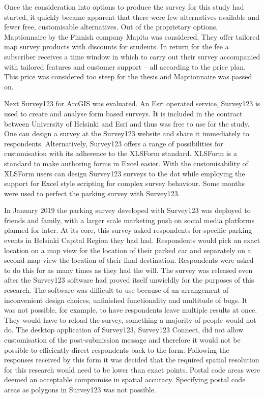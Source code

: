 Once the consideration into options to produce the survey for this study had started, it quickly became apparent that there were few alternatives available and fewer free, customisable alternatives. Out of the proprietary options, Maptionnaire by the Finnish company Mapita was considered. They offer tailored map survey products with discounts for students. In return for the fee a subscriber receives a time window in which to carry out their survey accompanied with tailored features and customer support -- all according to the price plan. This price was considered too steep for the thesis and Maptionnaire was passed on. 

Next Survey123 for ArcGIS was evaluated. An Esri operated service, Survey123 is used to create and analyse form based surveys. It is included in the contract between University of Helsinki and Esri and thus was free to use for the study. One can design a survey at the Survey123 website and share it immediately to respondents. Alternatively, Survey123 offers a range of possibilities for customisation with its adherence to the XLSForm standard. XLSForm is a standard to make authoring forms in Excel easier. With the customisability of XLSForm users can design Survey123 surveys to the dot while employing the support for Excel style scripting for complex survey behaviour. Some months were used to perfect the parking survey with Survey123. 

In January 2019 the parking survey developed with Survey123 was deployed to friends and family, with a larger scale marketing push on social media platforms planned for later. At its core, this survey asked respondents for specific parking events in Helsinki Capital Region they had had. Respondents would pick an exact location on a map view for the location of their parked car and separately on a second map view the location of their final destination. Respondents were asked to do this for as many times as they had the will. The survey was released even after the Survey123 software had proved itself unwieldly for the purposes of this research. The software was difficult to use because of an arrangement of inconvenient design choices, unfinished functionality and multitude of bugs. It was not possible, for example, to have respondents leave multiple results at once. They would have to reload the survey, something a majority of people would not do. The desktop application of Survey123, Survey123 Connect, did not allow customisation of the post-submission message and therefore it would not be possible to efficiently direct respondents back to the form. Following the responses received by this form it was decided that the required spatial resolution for this research would need to be lower than exact points. Postal code areas were deemed an acceptable compromise in spatial accuracy. Specifying postal code areas as polygons in Survey123 was not possible. 

